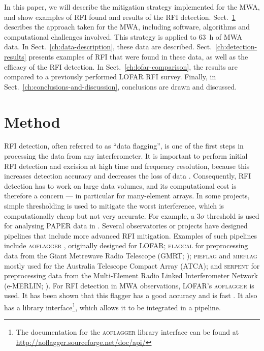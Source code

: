 \documentclass{pasa}
\begin{document}
In this paper, we will describe the mitigation strategy implemented for the MWA, and show examples of RFI found and results of the RFI detection. Sect.~\ref{ch:method} describes the approach taken for the MWA, including software, algorithms and computational challenges involved. This strategy is applied to 63~h of MWA data. In Sect.~\ref{ch:data-description}, these data are described. Sect.~\ref{ch:detection-results} presents examples of RFI that were found in these data, as well as the efficacy of the RFI detection. In Sect.~\ref{ch:lofar-comparison}, the results are compared to a previously performed LOFAR RFI survey. Finally, in Sect.~\ref{ch:conclusions-and-discussion}, conclusions are drawn and discussed.

\section{Method} \label{ch:method}
RFI detection, often referred to as ``data flagging'', is one of the first steps in processing the data from any interferometer. It is important to perform initial RFI detection and excision at high time and frequency resolution, because this increases detection accuracy and decreases the loss of data \citep{lofar-radio-environment}. Consequently, RFI detection has to work on large data volumes, and its computational cost is therefore a concern --- in particular for many-element arrays. In some projects, simple thresholding is used to mitigate the worst interference, which is computationally cheap but not very accurate. For example, a $3\sigma$ threshold is used for analysing PAPER data in \citet{parsons-paper-eorlimit-2014}. Several observatories or projects have designed pipelines that include more advanced RFI mitigation. Examples of such pipelines include \textsc{aoflagger} \citep{post-correlation-rfi-classification,scale-invariant-rank-operator}, originally designed for LOFAR; \textsc{flagcal} for preprocessing data from the Giant Metrewave Radio Telescope (GMRT; \citealt{prasad-flagcal-2012}); \textsc{pieflag} \citep{pieflag-middelberg-2006} and \textsc{mirflag} \citep{lenc-mirflag-2010} mostly used for the Australia Telescope Compact Array (ATCA); and \textsc{serpent} for preprocessing data from the Multi-Element Radio Linked Interferometer Network (e-MERLIN; \citealt{serpent-peck-2013}). For RFI detection in MWA observations, LOFAR's \textsc{aoflagger} is used. It has been shown that this flagger has a good accuracy and is fast \citep{lofar-radio-environment}. It also has a library interface\footnote{The documentation for the \textsc{aoflagger} library interface can be found at \url{http://aoflagger.sourceforge.net/doc/api/}}, which allows it to be integrated in a pipeline.
\end{document}
